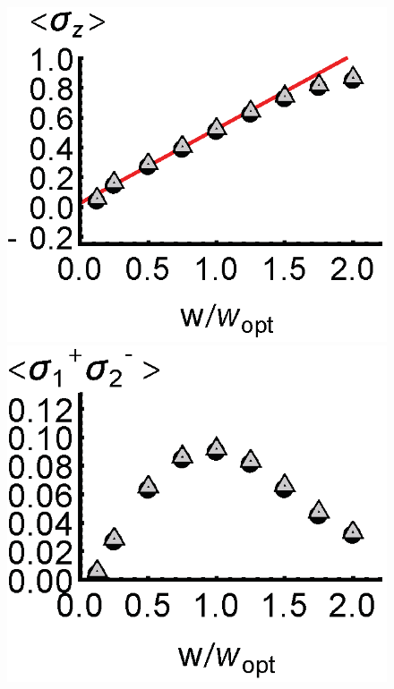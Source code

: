 \documentclass[aps,
twocolumn,
showpacs,
superscriptaddress,groupedaddress]{revtex4}
\begin{document}
\begin{figure}
\begin{center}
	\includegraphics[scale =0.38] {N40SuperradianceSZ.eps}
	\hspace{-5.0mm} \includegraphics[scale =0.38] {N40SuperradianceSPSM.eps}

\end{center}
\end{figure}
\end{document}
